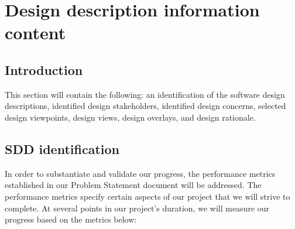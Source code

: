 \documentclass[onecolumn, draftclsnofoot,10pt, compsoc]{IEEEtran}
\begin{document}
\section{Design description information content}
\subsection{Introduction}
This section will contain the following: an identification of the software design descriptions, identified design stakeholders, identified design concerns, selected design viewpoints, design views, design overlays, and design rationale.

\subsection{SDD identification}
In order to substantiate and validate our progress, the performance metrics established in our Problem Statement document will be addressed. The performance metrics specify certain aspects of our project that we will strive to complete. At several points in our project's duration, we will measure our progress based on the metrics below:
\end{document}
